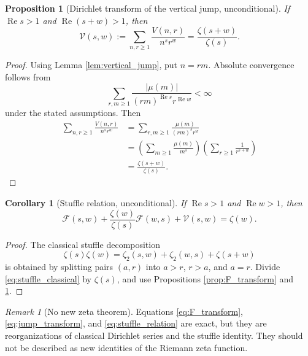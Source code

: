 \documentclass[11pt]{amsart}
\numberwithin{equation}{section}
\theoremstyle{plain}
\newtheorem{proposition}[theorem]{Proposition}
\newtheorem{corollary}[theorem]{Corollary}
\theoremstyle{definition}
\theoremstyle{remark}
\newtheorem{remark}[theorem]{Remark}
\newcommand{\mob}{\mu}
\newcommand{\zetaR}{\zeta}
\newcommand{\Vjump}{V}
\begin{document}
\begin{proposition}[Dirichlet transform of the vertical jump, unconditional]
\label{prop:jump_transform}
If \(\operatorname{Re}s>1\) and \(\operatorname{Re}(s+w)>1\), then
\begin{equation}
\mathscr V(s,w):=\sum_{n,r\ge1}\frac{\Vjump(n,r)}{n^s r^w}=\frac{\zetaR(s+w)}{\zetaR(s)}.
\label{eq:jump_transform}
\end{equation}
\end{proposition}

\begin{proof}
Using Lemma \ref{lem:vertical_jump}, put \(n=rm\).  Absolute convergence follows from
\begin{equation}
\sum_{r,m\ge1}\frac{|\mob(m)|}{(rm)^{\operatorname{Re}s}r^{\operatorname{Re}w}}<\infty
\label{eq:jump_transform_absolute}
\end{equation}
under the stated assumptions.  Then
\begin{align}
\sum_{n,r\ge1}\frac{\Vjump(n,r)}{n^s r^w}
&=\sum_{r,m\ge1}\frac{\mob(m)}{(rm)^s r^w} \\
&=\left(\sum_{m\ge1}\frac{\mob(m)}{m^s}\right)\left(\sum_{r\ge1}\frac1{r^{s+w}}\right) \\
&=\frac{\zetaR(s+w)}{\zetaR(s)}.
\label{eq:jump_transform_proof}
\end{align}
\end{proof}

\begin{corollary}[Stuffle relation, unconditional]
\label{cor:stuffle_relation}
If \(\operatorname{Re}s>1\) and \(\operatorname{Re}w>1\), then
\begin{equation}
\mathscr F(s,w)+\frac{\zetaR(w)}{\zetaR(s)}\mathscr F(w,s)+\mathscr V(s,w)=\zetaR(w).
\label{eq:stuffle_relation}
\end{equation}
\end{corollary}

\begin{proof}
The classical stuffle decomposition
\begin{equation}
\zetaR(s)\zetaR(w)=\zetaR_2(s,w)+\zetaR_2(w,s)+\zetaR(s+w)
\label{eq:stuffle_classical}
\end{equation}
is obtained by splitting pairs \((a,r)\) into \(a>r\), \(r>a\), and \(a=r\).  Divide \eqref{eq:stuffle_classical} by \(\zetaR(s)\), and use Propositions \ref{prop:F_transform} and \ref{prop:jump_transform}.
\end{proof}

\begin{remark}[No new zeta theorem]
\label{rem:no_new_zeta_theorem}
Equations \eqref{eq:F_transform}, \eqref{eq:jump_transform}, and \eqref{eq:stuffle_relation} are exact, but they are reorganizations of classical Dirichlet series and the stuffle identity.  They should not be described as new identities of the Riemann zeta function.
\end{remark}
\end{document}
